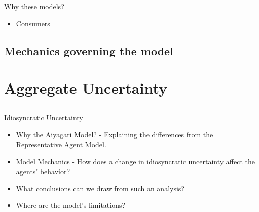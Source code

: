 \documentclass{beamer}
\begin{document}
\begin{frame}{Why these models?}
	\begin{itemize}
	
	\item {
	Consumers 
	}
	

	\end{itemize}

\end{frame}




\subsection{Mechanics governing the model}


\section{Aggregate Uncertainty}
\subsection{}

\begin{frame}{Idiosyncratic Uncertainty}
	\begin{itemize}
	
	\item {
	Why the Aiyagari Model? - Explaining the 				differences from the Representative Agent Model.
	}
	\item {
	Model Mechanics - How does a change in 					idiosyncratic uncertainty affect the agents' behavior?
	}
	\item {
	What conclusions can we draw from such an analysis?
	}
	\item {
	Where are the model's limitations?
	}		
	\end{itemize}

\end{frame}
\end{document}
